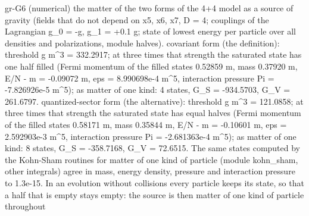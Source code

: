 \documentclass[
  10pt,
]{article}
\newenvironment{Shaded}{}{}
\newcommand{\NormalTok}[1]{#1}
\begin{document}
\begin{Shaded}
\begin{Highlighting}[]
\NormalTok{[PASS] gr{-}G6  (numerical) the matter of the two forms of the 4+4 model as a source of gravity (fields that do not depend on x5, x6, x7, D = 4; couplings of the Lagrangian g\_0 = {-}g, g\_1 = +0.1 g; state of lowest energy per particle over all densities and polarizations, module halves). covariant form (the definition): threshold g m\^{}3 = 332.2917; at three times that strength the saturated state has one half filled (Fermi momentum of the filled states 0.52859 m, mass 0.37920 m, E/N {-} m = {-}0.09072 m, eps = 8.990698e{-}4 m\^{}5, interaction pressure Pi = {-}7.826926e{-}5 m\^{}5); as matter of one kind: 4 states, G\_S = {-}934.5703, G\_V = 261.6797. quantized{-}sector form (the alternative): threshold g m\^{}3 = 121.0858; at three times that strength the saturated state has equal halves (Fermi momentum of the filled states 0.58171 m, mass 0.35844 m, E/N {-} m = {-}0.10601 m, eps = 2.592903e{-}3 m\^{}5, interaction pressure Pi = {-}2.681363e{-}4 m\^{}5); as matter of one kind: 8 states, G\_S = {-}358.7168, G\_V = 72.6515. The same states computed by the Kohn{-}Sham routines for matter of one kind of particle (module kohn\_sham, other integrals) agree in mass, energy density, pressure and interaction pressure to 1.3e{-}15. In an evolution without collisions every particle keeps its state, so that a half that is empty stays empty: the source is then matter of one kind of particle throughout}

\end{Highlighting}
\end{Shaded}
\end{document}

